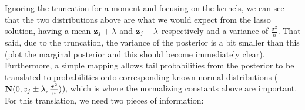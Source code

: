 
Ignoring the truncation for a moment and focusing on the kernels, we can see that the two distributions above are what we would expect from the lasso solution, having a mean $\mathbf{z}_{j} + \lambda$ and $\mathbf{z}_{j} - \lambda$ respectively and a variance of $\frac{\sigma^2}{n}$. That said, due to the truncation, the variance of the posterior is a bit smaller than this (plot the marginal posterior and this should become immediately clear). Furthermore, a simple mapping allows tail probabilities from the posterior to be translated to probabilities onto corresponding known normal distributions ($\mathbf{N}(0, z_j \pm \lambda, \frac{\sigma^2}{n})$), which is where the normalizing constants above are important. For this translation, we need two pieces of information:

